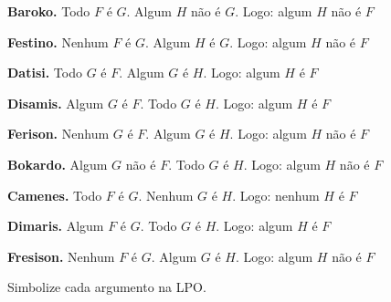 \begin{compactlist}
	\item[] 
\item \textbf{Baroko.} Todo $F$ é $G$. Algum $H$ não é $G$. Logo: algum $H$ não é $F$
	\item[] 
\item \textbf{Festino.} Nenhum $F$ é $G$. Algum $H$ é $G$. Logo: algum $H$ não é $F$
	\item[] 
\item \textbf{Datisi.} Todo $G$ é $F$. Algum $G$ é $H$. Logo: algum $H$ é $F$
	\item[] 
\item \textbf{Disamis.} Algum $G$ é $F$. Todo $G$ é $H$. Logo: algum $H$ é $F$
	\item[] 
\item \textbf{Ferison.} Nenhum $G$ é $F$. Algum $G$ é $H$. Logo: algum $H$ não é $F$
	\item[] 
\item \textbf{Bokardo.} Algum $G$ não é $F$. Todo $G$ é $H$. Logo: algum $H$ não é $F$
	\item[] 
\item \textbf{Camenes.} Todo $F$ é $G$. Nenhum $G$ é $H$. Logo: nenhum $H$ é $F$
	\item[] 
\item \textbf{Dimaris.} Algum $F$ é $G$. Todo $G$ é $H$. Logo: algum $H$ é $F$
	\item[] 
\item \textbf{Fresison.} Nenhum $F$ é $G$. Algum $G$ é $H$. Logo: algum $H$ não é $F$
\item[] 
\end{compactlist}
Simbolize cada argumento na LPO.

